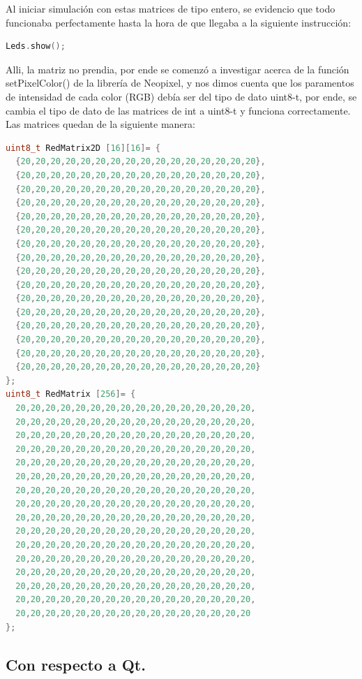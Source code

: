 \documentclass{article}
\begin{document}
Al iniciar simulación con estas matrices de tipo entero, se evidencio que todo funcionaba perfectamente hasta la hora de que llegaba a la siguiente instrucción:
\begin{lstlisting}[language=C++, label=show]
Leds.show();
\end{lstlisting}
Alli, la matriz no prendia, por ende se comenzó a investigar acerca de la función setPixelColor() de la librería de Neopixel, y nos dimos cuenta que los paramentos de intensidad de cada color (RGB) debía ser del tipo de dato uint8-t, por ende, se cambia el tipo de dato de las matrices de int a uint8-t y funciona correctamente.
Las matrices quedan de la siguiente manera:
\begin{lstlisting}[language=C++, label=codigo_matrices_uint]
uint8_t RedMatrix2D [16][16]= {
  {20,20,20,20,20,20,20,20,20,20,20,20,20,20,20,20},
  {20,20,20,20,20,20,20,20,20,20,20,20,20,20,20,20},
  {20,20,20,20,20,20,20,20,20,20,20,20,20,20,20,20},
  {20,20,20,20,20,20,20,20,20,20,20,20,20,20,20,20},
  {20,20,20,20,20,20,20,20,20,20,20,20,20,20,20,20},
  {20,20,20,20,20,20,20,20,20,20,20,20,20,20,20,20},
  {20,20,20,20,20,20,20,20,20,20,20,20,20,20,20,20},
  {20,20,20,20,20,20,20,20,20,20,20,20,20,20,20,20},
  {20,20,20,20,20,20,20,20,20,20,20,20,20,20,20,20},
  {20,20,20,20,20,20,20,20,20,20,20,20,20,20,20,20},
  {20,20,20,20,20,20,20,20,20,20,20,20,20,20,20,20},
  {20,20,20,20,20,20,20,20,20,20,20,20,20,20,20,20},
  {20,20,20,20,20,20,20,20,20,20,20,20,20,20,20,20},
  {20,20,20,20,20,20,20,20,20,20,20,20,20,20,20,20},
  {20,20,20,20,20,20,20,20,20,20,20,20,20,20,20,20},
  {20,20,20,20,20,20,20,20,20,20,20,20,20,20,20,20}
};
uint8_t RedMatrix [256]= {
  20,20,20,20,20,20,20,20,20,20,20,20,20,20,20,20,
  20,20,20,20,20,20,20,20,20,20,20,20,20,20,20,20,
  20,20,20,20,20,20,20,20,20,20,20,20,20,20,20,20,
  20,20,20,20,20,20,20,20,20,20,20,20,20,20,20,20,
  20,20,20,20,20,20,20,20,20,20,20,20,20,20,20,20,
  20,20,20,20,20,20,20,20,20,20,20,20,20,20,20,20,
  20,20,20,20,20,20,20,20,20,20,20,20,20,20,20,20,
  20,20,20,20,20,20,20,20,20,20,20,20,20,20,20,20,
  20,20,20,20,20,20,20,20,20,20,20,20,20,20,20,20,
  20,20,20,20,20,20,20,20,20,20,20,20,20,20,20,20,
  20,20,20,20,20,20,20,20,20,20,20,20,20,20,20,20,
  20,20,20,20,20,20,20,20,20,20,20,20,20,20,20,20,
  20,20,20,20,20,20,20,20,20,20,20,20,20,20,20,20,
  20,20,20,20,20,20,20,20,20,20,20,20,20,20,20,20,
  20,20,20,20,20,20,20,20,20,20,20,20,20,20,20,20,
  20,20,20,20,20,20,20,20,20,20,20,20,20,20,20,20
};
\end{lstlisting}
\subsection{Con respecto a Qt.}
\end{document}
